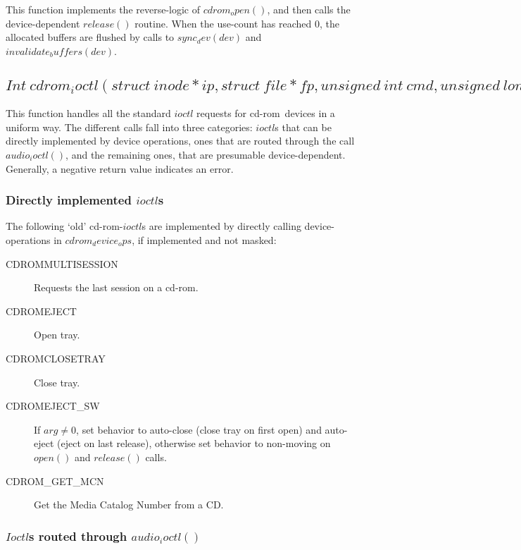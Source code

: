\documentclass{article}
\def\cdrom{{\sc cd-rom}}
\begin{document}
This function implements the reverse-logic of $cdrom_open()$, and then
calls the device-dependent $release()$ routine. When the use-count has
reached 0, the allocated buffers are flushed by calls to $sync_dev(dev)$
and $invalidate_buffers(dev)$.


\subsection{$Int\ cdrom_ioctl(struct\ inode *ip, struct\ file *fp,
unsigned\ int\ cmd, unsigned\ long\ arg)$}
\label{cdrom-ioctl}

This function handles all the standard $ioctl$ requests for \cdrom\
devices in a uniform way. The different calls fall into three
categories: $ioctl$s that can be directly implemented by device
operations, ones that are routed through the call $audio_ioctl()$, and
the remaining ones, that are presumable device-dependent. Generally, a
negative return value indicates an error.

\subsubsection{Directly implemented $ioctl$s}
\label{ioctl-direct}

The following `old' \cdrom-$ioctl$s are implemented by directly
calling device-operations in $cdrom_device_ops$, if implemented and
not masked:
\begin{description}
\item[CDROMMULTISESSION] Requests the last session on a \cdrom.
\item[CDROMEJECT] Open tray. 
\item[CDROMCLOSETRAY] Close tray.
\item[CDROMEJECT_SW] If $arg\not=0$, set behavior to auto-close (close
tray on first open) and auto-eject (eject on last release), otherwise
set behavior to non-moving on $open()$ and $release()$ calls.
\item[CDROM_GET_MCN] Get the Media Catalog Number from a CD.
\end{description}

\subsubsection{$Ioctl$s routed through $audio_ioctl()$}
\label{ioctl-audio}
\end{document}
